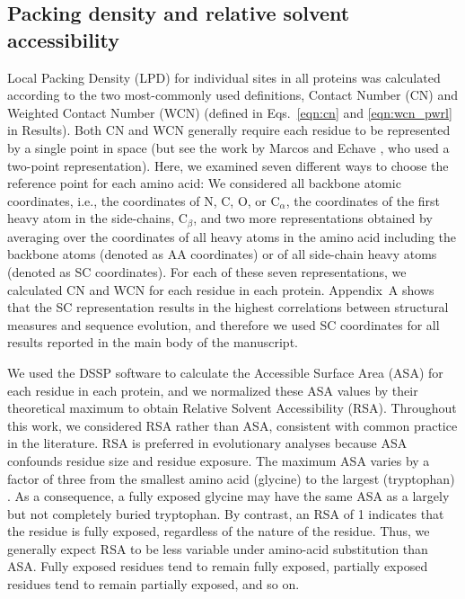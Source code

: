 \documentclass[12pt]{article}
\begin{document}
\subsection*{Packing density and relative solvent accessibility}

Local Packing Density (LPD) for individual sites in all proteins was calculated according to the two most-commonly used definitions, Contact Number (CN) and Weighted Contact Number (WCN) (defined in Eqs.~\ref{eqn:cn} and \ref{eqn:wcn_pwrl} in Results). Both CN and WCN generally require each residue to be represented by a single point in space 
(but see the work by Marcos and Echave \cite{marcos_too_2015}, who used a two-point representation). Here, we examined seven different ways to choose the reference point for each amino acid: We considered all backbone atomic coordinates, i.e., the coordinates of N, C, O, or C{$_\alpha$}, the coordinates of the first heavy atom in the side-chains, C{$_\beta$}, and two more representations obtained by averaging over the coordinates of all heavy atoms in the amino acid including the backbone atoms (denoted as AA coordinates) or of all side-chain heavy atoms (denoted as SC coordinates). For each of these seven representations, we calculated CN and WCN for each residue in each protein. Appendix~A shows that the SC representation results in the highest correlations between structural measures and sequence evolution, and therefore we used SC coordinates for all results reported in the main body of the manuscript.

We used the DSSP software \cite{kabsch_dictionary_1983} to calculate  the Accessible Surface Area (ASA) for each residue in each protein, and we normalized these ASA values by their theoretical maximum \cite{tien_maximum_2013} to obtain Relative Solvent Accessibility (RSA). Throughout this work, we considered RSA rather than ASA, consistent with common practice in the literature. RSA is preferred in evolutionary analyses because ASA confounds residue size and residue exposure. The maximum ASA varies by a factor of three from the smallest amino acid (glycine) to the largest (tryptophan) \cite{tien_maximum_2013}. As a consequence, a fully exposed glycine may have the same ASA as a largely but not completely buried tryptophan. By contrast, an RSA of 1 indicates that the residue is fully exposed, regardless of the nature of the residue. Thus, we generally expect RSA to be less variable under amino-acid substitution than ASA. Fully exposed residues tend to remain fully exposed, partially exposed residues tend to remain partially exposed, and so on.
\end{document}
